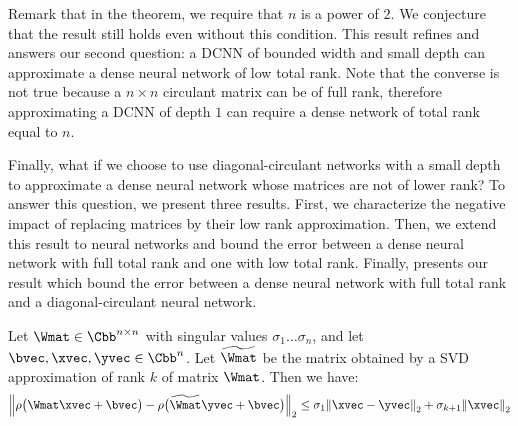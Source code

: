 \noindent
Remark that in the theorem, we require that $n$ is a power of $2$.
We conjecture that the result still holds even without this condition.
This result refines  and answers our second question: a DCNN of bounded width and small depth can approximate a dense neural network of low total rank.
Note that the converse is not true because a $n \times n$ circulant matrix can be of full rank, therefore approximating a DCNN of depth $1$ can require a dense network of total rank equal to $n$.

Finally, what if we choose to use diagonal-circulant networks with a small depth to approximate a dense neural network whose matrices are not of lower rank? 
To answer this question, we present three results. First, we characterize the negative impact of replacing matrices by their low rank approximation.
Then, we extend this result to neural networks and bound the error between a dense neural network with full total rank and one with low total rank.
Finally,  presents our result which bound the error between a dense neural network with full total rank and a diagonal-circulant neural network.


\begin{lemma} \label{lemma:ch4-bound_one_layer}
  Let $\Wmat \in \Cnn$ with singular values $\sigma_1 \ldots \sigma_n$, and let $\bvec, \xvec, \yvec \in \Cn$.
  Let $\widetilde{\Wmat}$ be the matrix obtained by a SVD approximation of rank $k$ of matrix $\Wmat$.
  Then we have:
  \begin{equation}
    \norm{ \act \big( \Wmat\xvec + \bvec \big) - \act \big( \widetilde{\Wmat}\yvec + \bvec \big)}_2 \le \sigma_{1} \norm{\xvec - \yvec}_2 + \sigma_{k+1} \norm{\xvec}_2 
  \end{equation}
  \removespace
\end{lemma}

